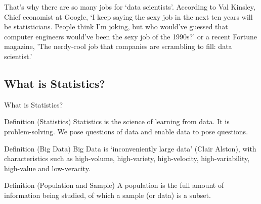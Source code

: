 \documentclass[t,xcolor=pdftex,dvipsnames,table]{beamer}\usepackage[]{graphicx}\usepackage[]{color}
\begin{document}
\begin{frame}{}
That's why there are so many jobs for `data scientists'. According to Val Kinsley, Chief economist at Google, `I keep saying the sexy job in the next ten years will be statisticians. People think I'm joking, but who would've guessed that computer engineers would've been the sexy job of the 1990s?' or a recent Fortune magazine, 'The nerdy-cool job that companies are scrambling to fill: data scientist.'

\vspace{.5cm}
\href{https://en.wikipedia.org/wiki/Frazz}{} 
\href{http://vadlo.com/Research_Cartoons/Depends-upon-what-is-more-publishable.gif}{}
\href{https://flowingdata.com/category/statistics/mistaken-data/}{} 
\href{http://www.mckinsey.com/insights/innovation/hal_varian_on_how_the_web_challenges_managers}{}  
\href{http://www.careercast.com/jobs-rated/jobs-rated-report-2016-ranking-200-jobs}{}
\href{www.nytimes.com/2000/07/28/us/john-tukey-85-statistician-coined-the-word-software.html}{}
\href{http://www.amadeus.com/blog/18/06/10-reasons-why-data-scientist-is-the-sexiest-job-or-not/}{}
\href{http://fortune.com/2011/09/06/data-scientist-the-hot-new-gig-in-tech/}{}
\end{frame}



\subsection[]{What is Statistics?}
\begin{frame}{What is Statistics?}
\begin{block}{Definition (Statistics)}
Statistics is the science of learning from data. It is problem-solving. We pose questions of data and enable data to pose questions.
\end{block}

\begin{block}{Definition (Big Data)}
Big Data is `inconveniently large data’ (Clair Alston), with characteristics such as high-volume, high-variety, high-velocity, high-variability, high-value and low-veracity.
\end{block}

\begin{block}{Definition (Population and Sample)}
A population is the full amount of information being studied, of which a sample (or data) is a subset.
\end{block}
\end{frame}
\end{document}
